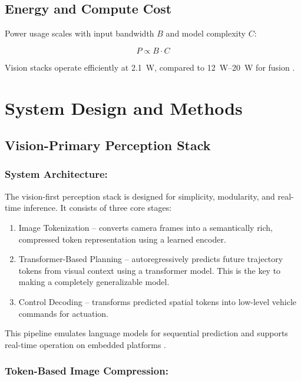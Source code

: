 \documentclass[12pt]{article}
\begin{document}
\subsection{Energy and Compute Cost}

Power usage scales with input bandwidth \( B \) and model complexity \( C \):

\begin{equation}
P \propto B \cdot C
\label{eq:power_model}
\end{equation}

Vision stacks operate efficiently at \SI{2.1}{\watt}, compared to \SIrange{12}{20}{\watt} for fusion \cite{Chen2024EndToEndAD, Rana2023PerceptionSystems}.
\section{System Design and Methods}

\subsection{Vision-Primary Perception Stack}

\subsubsection{System Architecture:}

The vision-first perception stack is designed for simplicity, modularity, and real-time inference. It consists of three core stages:

\begin{enumerate}[label=\alph*)]
  \item Image Tokenization – converts camera frames into a semantically rich, compressed token representation using a learned encoder.
  \item Transformer-Based Planning – autoregressively predicts future trajectory
		tokens from visual context using a transformer model. This is the key to
		making a completely generalizable model.
  \item Control Decoding – transforms predicted spatial tokens into low-level vehicle commands for actuation.
\end{enumerate}

This pipeline emulates language models for sequential prediction and supports real-time operation on embedded platforms \autocite{goff2025learningdriveworldmodel}.

\subsubsection{Token-Based Image Compression:}
\end{document}
